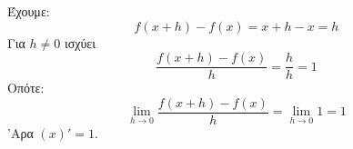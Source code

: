 Έχουμε:
\[ f(x+h)-f(x)=x+h-x=h \]
Για $ h\neq 0 $ ισχύει
\[ \frac{f(x+h)-f(x)}{h}=\frac{h}{h}=1 \]
Οπότε:
\[ \lim_{h\to 0}{\frac{f(x+h)-f(x)}{h}}=\lim_{h\to 0}1=1 \]
'Αρα $ (x)'=1 $.
